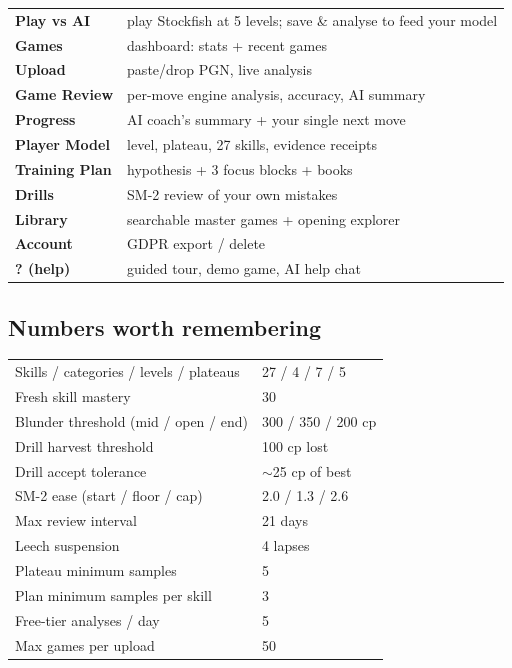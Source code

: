 \documentclass[11pt]{article}
\begin{document}
\begin{center}
\begin{tabularx}{\linewidth}{@{}l Y@{}}
\toprule
\textbf{Play vs AI} & play Stockfish at 5 levels; save \& analyse to feed your model \\
\textbf{Games} & dashboard: stats + recent games \\
\textbf{Upload} & paste/drop PGN, live analysis \\
\textbf{Game Review} & per-move engine analysis, accuracy, AI summary \\
\textbf{Progress} & AI coach's summary + your single next move \\
\textbf{Player Model} & level, plateau, 27 skills, evidence receipts \\
\textbf{Training Plan} & hypothesis + 3 focus blocks + books \\
\textbf{Drills} & SM-2 review of your own mistakes \\
\textbf{Library} & searchable master games + opening explorer \\
\textbf{Account} & GDPR export / delete \\
\textbf{? (help)} & guided tour, demo game, AI help chat \\
\bottomrule
\end{tabularx}
\end{center}

\subsection{Numbers worth remembering}

\begin{center}
\tabnum
\begin{tabularx}{\linewidth}{@{}Y l@{}}
\toprule
Skills / categories / levels / plateaus & 27 / 4 / 7 / 5 \\
Fresh skill mastery & 30 \\
Blunder threshold (mid / open / end) & 300 / 350 / 200 cp \\
Drill harvest threshold & 100 cp lost \\
Drill accept tolerance & $\sim$25 cp of best \\
SM-2 ease (start / floor / cap) & 2.0 / 1.3 / 2.6 \\
Max review interval & 21 days \\
Leech suspension & 4 lapses \\
Plateau minimum samples & 5 \\
Plan minimum samples per skill & 3 \\
Free-tier analyses / day & 5 \\
Max games per upload & 50 \\
\bottomrule
\end{tabularx}
\end{center}
\end{document}
